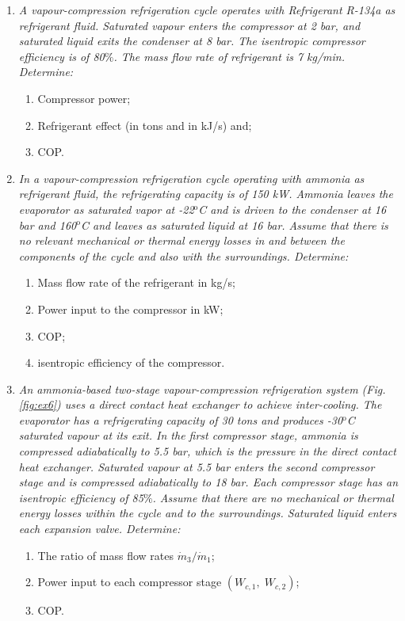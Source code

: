 \begin{enumerate}
\item \label{Ex7} {\it A vapour-compression refrigeration cycle operates with Refrigerant R-134a as refrigerant fluid. Saturated vapour enters the compressor at 2 bar, and saturated liquid exits the condenser at 8 bar. The isentropic compressor efficiency is of 80$\%$. The mass flow rate  of refrigerant is 7 kg/min. Determine:
\begin{enumerate}
\item Compressor power;
\item Refrigerant effect (in tons and in kJ/s) and;
\item COP.
\end{enumerate}
}

\item \label{Ex8} {\it In a vapour-compression refrigeration cycle operating with ammonia as refrigerant fluid, the refrigerating capacity is of 150 kW. Ammonia leaves the evaporator as saturated vapor at -22$^{\text{o}}$C and is driven to the condenser at 16 bar and 160$^{\text{o}}$C and leaves as saturated liquid at 16 bar. Assume that there is no relevant mechanical or thermal energy losses in and between the components of the cycle and also with the surroundings. Determine:
\begin{enumerate}
\item Mass flow rate of the refrigerant in kg/s;
\item Power input to the compressor in kW;
\item COP;
\item isentropic efficiency of the compressor.
\end{enumerate} 
}


\item \label{Ex9} {\it An ammonia-based two-stage vapour-compression refrigeration system (Fig. \ref{fig:ex6}) uses a direct contact heat exchanger to achieve inter-cooling. The evaporator has a refrigerating capacity of 30 tons and produces -30$^{\text{o}}$C saturated vapour at its exit. In the first compressor stage, ammonia is compressed adiabatically to 5.5 bar, which is the pressure in the direct contact heat exchanger. Saturated vapour at 5.5 bar enters the second compressor stage and is compressed adiabatically to 18 bar.  Each compressor stage has an isentropic efficiency of 85$\%$. Assume that there are no mechanical or thermal energy losses within the cycle and to the surroundings. Saturated liquid enters each expansion valve. Determine:
\begin{enumerate}
\item The ratio of mass flow rates $\dot{m}_{3}/\dot{m}_{1}$;
\item Power input to each compressor stage $\left(W_{c,1},\;W_{c,2}\right)$;
\item COP.
\end{enumerate}
}



\end{enumerate}
